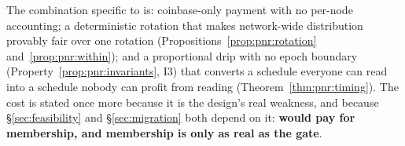The combination specific to \Flux is: coinbase-only payment with no per-node accounting; a
deterministic rotation that makes network-wide distribution provably fair over one rotation
(Propositions~\ref{prop:pnr:rotation} and~\ref{prop:pnr:within}); and a proportional drip with no
epoch boundary (Property~\ref{prop:pnr:invariants}, I3) that converts a schedule everyone can read
into a schedule nobody can profit from reading (Theorem~\ref{thm:pnr:timing}). The cost is stated
once more because it is the design's real weakness, and because \S\ref{sec:feasibility} and \S\ref{sec:migration} both depend on it:
\textbf{\PNR would pay for membership, and membership is only as real as the gate}.

\FloatBarrier
